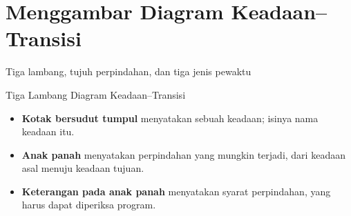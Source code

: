 \documentclass[aspectratio=169,10pt]{beamer}
\begin{document}
\section{Menggambar Diagram Keadaan--Transisi}
  {Tiga lambang, tujuh perpindahan, dan tiga jenis pewaktu}

\begin{frame}{Tiga Lambang Diagram Keadaan--Transisi}
\begin{center}
\end{center}
\vspace{-0.04cm}
\begin{itemize}
  \item \textbf{Kotak bersudut tumpul} menyatakan sebuah keadaan; isinya nama
        keadaan itu.
  \item \textbf{Anak panah} menyatakan perpindahan yang mungkin terjadi, dari
        keadaan asal menuju keadaan tujuan.
  \item \textbf{Keterangan pada anak panah} menyatakan syarat perpindahan,
        yang harus dapat diperiksa program.
\end{itemize}
\end{frame}
\end{document}
